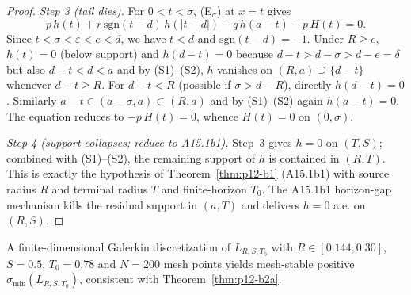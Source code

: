 \begin{proof}
\medskip
\noindent\emph{Step 3 (tail dies).}
For $0 < t < \sigma$, (E$_\sigma$) at $x = t$ gives
\[
p\, h(t) + r\, \mathrm{sgn}(t - d)\, h(|t - d|) - q\, h(a - t) - p\, H(t) = 0.
\]
Since $t < \sigma < \varepsilon < e < d$, we have $t < d$ and
$\mathrm{sgn}(t-d) = -1$.  Under $R \ge e$, $h(t) = 0$ (below support)
and $h(d - t) = 0$ because $d - t > d - \sigma > d - e = \delta$ but
also $d - t < d < a$ and by (S1)--(S2), $h$ vanishes on
$(R, a) \supseteq \{d - t\}$ whenever $d - t \ge R$.  For $d - t < R$
(possible if $\sigma > d - R$), directly $h(d - t) = 0$.  Similarly
$a - t \in (a - \sigma, a) \subset (R, a)$ and by (S1)--(S2) again
$h(a - t) = 0$.  The equation reduces to $-p\, H(t) = 0$,
whence $H(t) = 0$ on $(0, \sigma)$.

\medskip
\noindent\emph{Step 4 (support collapses; reduce to A15.1b1).}
Step~3 gives $h = 0$ on $(T, S)$; combined with (S1)--(S2), the
remaining support of $h$ is contained in $(R, T)$.  This is exactly
the hypothesis of Theorem~\ref{thm:p12-b1} (A15.1b1) with source
radius $R$ and terminal radius $T$ and finite-horizon $T_0$.  The
A15.1b1 horizon-gap mechanism kills the residual support in $(a, T)$
and delivers $h = 0$ a.e. on $(R, S)$.
\end{proof}

\begin{remark}\label{rem:p12-b2a-numerical}
A finite-dimensional Galerkin discretization of $L_{R,S,T_0}$ with
$R \in [0.144, 0.30]$, $S = 0.5$, $T_0 = 0.78$ and $N = 200$ mesh
points yields mesh-stable positive $\sigma_{\min}(L_{R,S,T_0})$,
consistent with Theorem~\ref{thm:p12-b2a}.
\end{remark}

